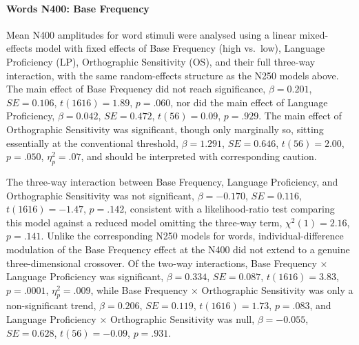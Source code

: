\documentclass[utf8]{FrontiersinHarvard} %
\begin{document}
	\paragraph*{Words N400: Base Frequency}

	Mean N400 amplitudes for word stimuli were analysed using a linear mixed-effects model with fixed effects of Base Frequency (high vs.\ low), Language Proficiency (LP), Orthographic Sensitivity (OS), and their full three-way interaction, with the same random-effects structure as the N250 models above. The main effect of Base Frequency did not reach significance, $\beta = 0.201$, $SE = 0.106$, $t(1616) = 1.89$, $p = .060$, nor did the main effect of Language Proficiency, $\beta = 0.042$, $SE = 0.472$, $t(56) = 0.09$, $p = .929$. The main effect of Orthographic Sensitivity was significant, though only marginally so, sitting essentially at the conventional threshold, $\beta = 1.291$, $SE = 0.646$, $t(56) = 2.00$, $p = .050$, $\eta^2_p = .07$, and should be interpreted with corresponding caution.

	The three-way interaction between Base Frequency, Language Proficiency, and Orthographic Sensitivity was not significant, $\beta = -0.170$, $SE = 0.116$, $t(1616) = -1.47$, $p = .142$, consistent with a likelihood-ratio test comparing this model against a reduced model omitting the three-way term, $\chi^2(1) = 2.16$, $p = .141$. Unlike the corresponding N250 models for words, individual-difference modulation of the Base Frequency effect at the N400 did not extend to a genuine three-dimensional crossover. Of the two-way interactions, Base Frequency $\times$ Language Proficiency was significant, $\beta = 0.334$, $SE = 0.087$, $t(1616) = 3.83$, $p = .0001$, $\eta^2_p = .009$, while Base Frequency $\times$ Orthographic Sensitivity was only a non-significant trend, $\beta = 0.206$, $SE = 0.119$, $t(1616) = 1.73$, $p = .083$, and Language Proficiency $\times$ Orthographic Sensitivity was null, $\beta = -0.055$, $SE = 0.628$, $t(56) = -0.09$, $p = .931$.
\end{document}
